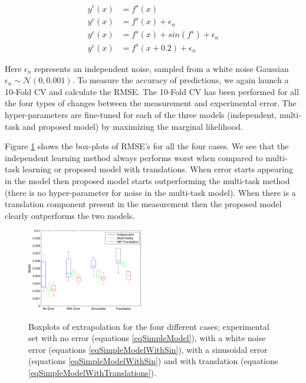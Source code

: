 \begin{align}
	y^{e}(x) & = f^{s}(x) \label{eqSimpleModel} \\
	y^{e}(x) & = f^{s}(x) + \epsilon_{n} \label{eqSimpleModelWithError} \\
	y^{e}(x) & = f^{s}(x) + sin(f^{s}) + \epsilon_{n} \label{eqSimpleModelWithSin} \\
	y^{e}(x) & = f^{s}(x + 0.2) + \epsilon_{n} \label{eqSimpleModelWithTranslations}
\end{align}

Here $\epsilon_{n}$ represents an independent noise, sampled from a white noise Gaussian $\epsilon_{n} \sim \mathcal{N}(0, 0.001)$. To measure the accuracy of predictions, we again launch a 10-Fold CV and calculate the RMSE. The 10-Fold CV has been performed for all the four types of changes between the measurement and experimental error. The hyper-parameters are fine-tuned for each of the three models (independent, multi-task and proposed model) by maximizing the marginal likelihood. 

Figure \ref{figResultsOfExtrapolation} shows the box-plots of RMSE's for all the four cases. We see that the independent learning method always performs worst when compared to multi-task learning or proposed model with translations. When error starts appearing in the model then proposed model starts outperforming the multi-task method (there is no hyper-parameter for noise in the multi-task model). When there is a translation component present in the measurement then the proposed model clearly outperforms the two models.

\begin{figure}[!ht]
  \centering
        \includegraphics[width=0.45\textwidth]
        {images/part3/boxPlotsClAlphaAccuracyMeasure}
        \label{subFigboxPlotsClAlphaAccuracyMeasure}
       \caption{Boxplots of extrapolation for the four different cases; experimental set with no error (equations \ref{eqSimpleModel}), with a white noise error (equations \ref{eqSimpleModelWithSin}), with a sinusoidal error (equations \ref{eqSimpleModelWithSin}) and with translation (equations \ref{eqSimpleModelWithTranslations}). }
       \label{figResultsOfExtrapolation}
\end{figure}

